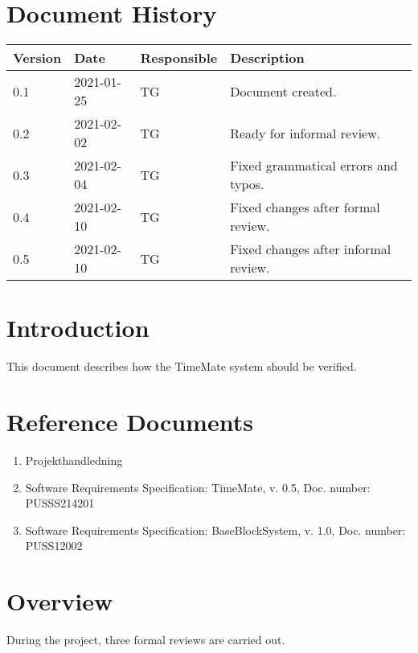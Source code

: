 \documentclass{article}
\date {#1}
\title {
    \documentNumber {02}    
    
    \documentVersion {0.5}
    
    \documentTitle {Software Verification and Validation Specification}
    \documentGroup {2}
    
    \documentResponsible {Test Group}
    \documentAuthors {Test Group}
    
    \documentDate {2021-02-10}
}
\begin{document}
\maketitle
\thispagestyle{empty}

\newpage

\tableofcontents

\newpage



\section{Document History}
\begin{tabular}{ l | l | l | l }
    Version & Date & Responsible & Description \\
    \hline
    0.1 & 2021-01-25 & TG & Document created. \\
    0.2 & 2021-02-02 & TG & Ready for informal review. \\
    0.3 & 2021-02-04 & TG & Fixed grammatical errors and typos. \\
    0.4 & 2021-02-10 & TG & Fixed changes after formal review. \\
    0.5 & 2021-02-10 & TG & Fixed changes after informal review. \\

\end{tabular}

\section{Introduction}

	This document describes how the TimeMate system should be verified. 

\section{Reference Documents}

\begin{enumerate}
  \item Projekthandledning 
  \item Software Requirements Specification: TimeMate, v. 0.5, Doc. number: PUSSS214201
  \item Software Requirements Specification: BaseBlockSystem, v. 1.0, Doc. number: PUSS12002

\end{enumerate}

\section{Overview}
During the project, three formal reviews are carried out.
\end{document}
